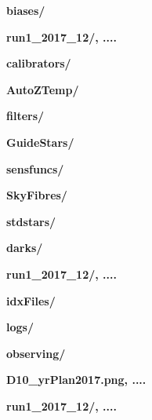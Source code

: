 \documentclass[12pt]{article}
\begin{document}
\hspace{10mm} \textbf{biases/}
\vspace{1mm}

\hspace{15mm} \textbf{run1\_2017\_12/, ....} 
\vspace{1mm}

\hspace{10mm} \textbf{calibrators/} 
\vspace{1mm}

\hspace{15mm} \textbf{AutoZTemp/} 
\vspace{1mm}

\hspace{15mm} \textbf{filters/} 
\vspace{1mm}

\hspace{15mm} \textbf{GuideStars/}
\vspace{1mm}

\hspace{15mm} \textbf{sensfuncs/}
\vspace{1mm}

\hspace{15mm} \textbf{SkyFibres/}
\vspace{1mm}

\hspace{15mm} \textbf{stdstars/}
\vspace{1mm}

\hspace{10mm} \textbf{darks/} 
\vspace{1mm}

\hspace{15mm} \textbf{run1\_2017\_12/, ....}
\vspace{1mm}

\hspace{10mm} \textbf{idxFiles/} 
\vspace{1mm}

\hspace{10mm} \textbf{logs/} 
\vspace{1mm}

\hspace{10mm} \textbf{observing/} 
\vspace{1mm}

\hspace{15mm} \textbf{D10\_yrPlan2017.png, ....} 
\vspace{1mm}

\hspace{15mm} \textbf{run1\_2017\_12/, ....} 
\vspace{1mm}
\end{document}

